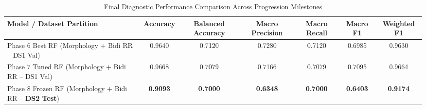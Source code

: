 \begin{table}[t]
\centering
\caption{Final Diagnostic Performance Comparison Across Progression Milestones}
\label{tab:final_performance}
\begin{tabular}{lcccccc}
\hline
\textbf{Model / Dataset Partition} & \textbf{Accuracy} & \textbf{Balanced Accuracy} & \textbf{Macro Precision} & \textbf{Macro Recall} & \textbf{Macro F1} & \textbf{Weighted F1} \\
\hline
Phase 6 Best RF (Morphology + Bidi RR -- DS1 Val) & 0.9640 & 0.7120 & 0.7280 & 0.7120 & 0.6985 & 0.9630 \\
Phase 7 Tuned RF (Morphology + Bidi RR -- DS1 Val) & 0.9668 & 0.7079 & 0.7166 & 0.7079 & 0.7095 & 0.9664 \\
Phase 8 Frozen RF (Morphology + Bidi RR -- \textbf{DS2 Test}) & \textbf{0.9093} & \textbf{0.7000} & \textbf{0.6348} & \textbf{0.7000} & \textbf{0.6403} & \textbf{0.9174} \\
\hline
\end{tabular}
\end{table}
